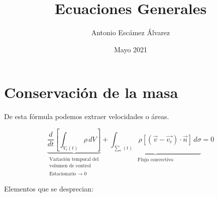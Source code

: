 \documentclass[10pt,a4paper]{article}
\title{Ecuaciones Generales}
\author{Antonio Escámez Álvarez}
\date{Mayo 2021}
\begin{document}
\maketitle
\newpage
\tableofcontents
\newpage

\section{Conservación de la masa}
De esta fórmula podemos extraer velocidades o áreas.
\begin{center}
    \begin{tcolorbox}[colback=yellow!40!white, colframe=red!50!black,title=Conservación de la masa]
    $$
        \underbrace{\frac{d}{dt} \left[\int_{V_c(t)}^{} \rho \,dV \right] }_{\substack{\text{Variación temporal del} \\ \text{volumen de control} \\ \text{} \\ \text{Estacionario $\xrightarrow{}$ 0}}} + \underbrace{\int_{\sum_c(t)}^{} \rho \left[\left(\vec{v} - \vec{v_c}\right) \cdot \vec{n} \right] \, d\sigma}_{\substack{{\text {Flujo convectivo}} \\ {}}} = 0
    $$
    \end{tcolorbox}
\end{center}
Elementos que se desprecian:
\end{document}
